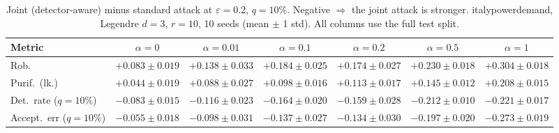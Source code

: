 \begin{table}[htbp]
  \centering
  \small
  \begin{tabular}{@{}lcccccc@{}}
    \toprule
    Metric & $\alpha{=}0$ & $\alpha{=}0.01$ & $\alpha{=}0.1$ & $\alpha{=}0.2$ & $\alpha{=}0.5$ & $\alpha{=}1$ \\
    \midrule
    Rob. & $+0.083 \pm 0.019$ & $+0.138 \pm 0.033$ & $+0.184 \pm 0.025$ & $+0.174 \pm 0.027$ & $+0.230 \pm 0.018$ & $+0.304 \pm 0.018$ \\
    Purif.\ (lk.) & $+0.044 \pm 0.019$ & $+0.088 \pm 0.027$ & $+0.098 \pm 0.016$ & $+0.113 \pm 0.017$ & $+0.145 \pm 0.012$ & $+0.208 \pm 0.015$ \\
    Det.\ rate ($q{=}10\%$) & $-0.083 \pm 0.015$ & $-0.116 \pm 0.023$ & $-0.164 \pm 0.020$ & $-0.159 \pm 0.028$ & $-0.212 \pm 0.010$ & $-0.221 \pm 0.017$ \\
    Accept.\ err ($q{=}10\%$) & $-0.055 \pm 0.018$ & $-0.098 \pm 0.031$ & $-0.137 \pm 0.027$ & $-0.134 \pm 0.030$ & $-0.197 \pm 0.020$ & $-0.273 \pm 0.019$ \\
    \bottomrule
  \end{tabular}
  \caption{Joint (detector-aware) minus standard attack at $\varepsilon=0.2$, $q{=}10\%$. Negative $\Rightarrow$ the joint attack is stronger. italypowerdemand, Legendre $d{=}3$, $r{=}10$, 10 seeds (mean $\pm$ 1 std). All columns use the full test split.}
  \label{tab:italypowerdemand_joint_r10_eps0.2}
\end{table}
